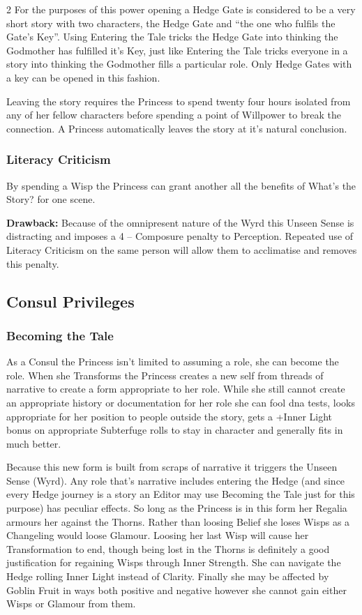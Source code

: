\begin{multicols}{2}
For the purposes of this power opening a Hedge Gate is considered to be a very short story with two characters, the Hedge Gate and \textquotedblleft the one who fulfils the Gate's Key\textquotedblright. Using Entering the Tale tricks the Hedge Gate into thinking the Godmother has fulfilled it's Key, just like Entering the Tale tricks everyone in a story into thinking the Godmother fills a particular role. Only Hedge Gates with a key can be opened in this fashion.

Leaving the story requires the Princess to spend twenty four hours isolated from any of her fellow characters before spending a point of Willpower to break the connection. A Princess automatically leaves the story at it's natural conclusion.


\subsubsection*{Literacy Criticism}
By spending a Wisp the Princess can grant another all the benefits of What's the Story? for one scene.

\textbf{Drawback:} Because of the omnipresent nature of the Wyrd this Unseen Sense is distracting and imposes a 4 – Composure penalty to Perception. Repeated use of Literacy Criticism on the same person will allow them to acclimatise and removes this penalty. 

\subsection*{Consul Privileges}

\subsubsection*{Becoming the Tale}

As a Consul the Princess isn't limited to assuming a role, she can become the role. When she Transforms the Princess creates a new self from threads of narrative to create a form appropriate to her role. While she still cannot create an appropriate history or documentation for her role she can fool dna tests, looks appropriate for her position to people outside the story, gets a +Inner Light bonus on appropriate Subterfuge rolls to stay in character and generally fits in much better. 

Because this new form is built from scraps of narrative it triggers the Unseen Sense (Wyrd). Any role that's narrative includes entering the Hedge (and since every Hedge journey is a story an Editor may use Becoming the Tale just for this purpose) has peculiar effects. So long as the Princess is in this form her Regalia armours her against the Thorns. Rather than loosing Belief she loses Wisps as a Changeling would loose Glamour. Loosing her last Wisp will cause her Transformation to end, though being lost in the Thorns is definitely a good justification for regaining Wisps through Inner Strength. She can navigate the Hedge rolling Inner Light instead of Clarity. Finally she may be affected by Goblin Fruit in ways both positive and negative however she cannot gain either Wisps or Glamour from them. 


\end{multicols}
